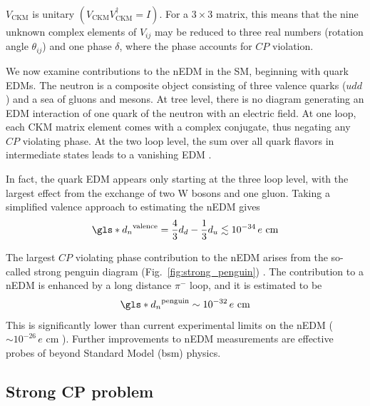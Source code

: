 $V_\text{CKM}$ is unitary $(V_\text{CKM}V_\text{CKM}^\dag=I)$. For a $3 \times 3$ matrix, this means that the nine unknown complex elements of $V_{ij}$ may be reduced to three real numbers (rotation angle $\theta_{ij}$) and one phase $\delta$, where the phase accounts for $CP$ violation.

We now examine contributions to the nEDM in the SM, beginning with quark EDMs. The neutron is a composite object consisting of three valence quarks ($udd$) and a sea of gluons and mesons. At tree level, there is no diagram generating an EDM interaction of one quark of the neutron with an electric field. At one loop, each CKM matrix element comes with a complex conjugate, thus negating any $CP$ violating phase. At the two loop level, the sum over all quark flavors in intermediate states leads to a vanishing EDM \cite{schmidt-wellenburg_quest_2017, czarnecki2018}.

In fact, the quark EDM appears only starting at the three loop level, with the largest effect from the exchange of two W bosons and one gluon. Taking a simplified valence approach to estimating the nEDM gives \cite{czarnecki2018}
%
\begin{gather}
    \gls*{d_n}^\text{valence} = \frac{4}{3}d_d - \frac{1}{3}d_u \lesssim 10^{-34}\,e\text{ cm}
\end{gather}

The largest $CP$ violating phase contribution to the nEDM arises from the so-called strong penguin diagram (Fig.~\ref{fig:strong_penguin}) \cite{pospelov_electric_2005}. The contribution to a nEDM is enhanced by a long distance $\pi^-$ loop, and it is estimated to be
%
\begin{gather}
    \gls*{d_n}^\text{penguin} \sim 10^{-32}\,e\text{ cm}
\end{gather}
%
This is significantly lower than current experimental limits on the nEDM ($\sim 10^{-26}\,e\text{ cm}$ \cite{ABE20}). Further improvements to nEDM measurements are effective probes of beyond Standard Model (\acrshort*{bsm}) physics.


\subsection{Strong CP problem}


